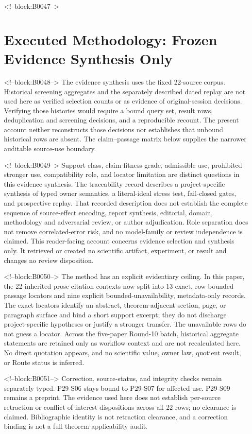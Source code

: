 \documentclass[11pt,a4paper]{article}
\begin{document}
<!--block:B0047-->
\section{Executed Methodology: Frozen Evidence Synthesis Only}

<!--block:B0048-->
The evidence synthesis uses the fixed 22-source corpus. Historical screening aggregates and the separately described dated replay are not used here as verified selection counts or as evidence of original-session decisions. Verifying those histories would require a bound query set, result rows, deduplication and screening decisions, and a reproducible recount. The present account neither reconstructs those decisions nor establishes that unbound historical rows are absent. The claim--passage matrix below supplies the narrower auditable source-use boundary.

<!--block:B0049-->
Support class, claim-fitness grade, admissible use, prohibited stronger use, compatibility role, and locator limitation are distinct questions in this evidence synthesis. The traceability record describes a project-specific synthesis of typed owner semantics, a literal-ideal stress test, fail-closed gates, and prospective replay. That recorded description does not establish the complete sequence of source-effect encoding, report synthesis, editorial, domain, methodology and adversarial review, or author adjudication. Role separation does not remove correlated-error risk, and no model-family or review independence is claimed. This reader-facing account concerns evidence selection and synthesis only. It retrieved or created no scientific artifact, experiment, or result and changes no review disposition.

<!--block:B0050-->
The method has an explicit evidentiary ceiling. In this paper,
the 22 inherited prose citation contexts now split into 13 exact, row-bounded passage
locators and nine explicit bounded-unavailability, metadata-only records. The exact
locators identify an abstract, theorem-adjacent section, page, or paragraph surface
and bind a short support excerpt; they do not discharge project-specific hypotheses
or justify a stronger transfer. The unavailable rows do not guess a locator. Across
the five-paper Round-10 batch, historical aggregate statements are retained only as
workflow context and are not recalculated here. No direct quotation appears, and no
scientific value, owner law, quotient result, or Route status is inferred.

<!--block:B0051-->
Correction, source-status, and integrity checks remain separately typed. P29-S06 stays bound to P29-S07 for affected use. P29-S09 remains a preprint. The evidence used here does not establish per-source retraction or conflict-of-interest dispositions across all 22 rows; no clearance is claimed. Bibliographic identity is not retraction clearance, and a correction binding is not a full theorem-applicability audit.
\end{document}
